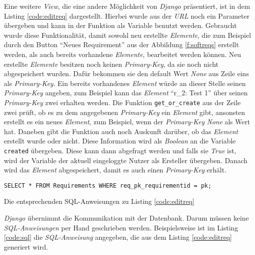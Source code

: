 \documentclass[11pt,a4paper]{report}
\begin{document}
Eine weitere \textit{View}, die eine andere Möglichkeit von \textit{Django} präsentiert, ist in dem Listing \ref{code:editreq} dargestellt. Hierbei wurde aus der \textit{URL} noch ein Parameter übergeben und kann in der Funktion als Variable benutzt werden. Gebraucht wurde diese Funktionalität, damit sowohl neu erstellte \textit{Elemente}, die zum Beispiel durch den Button "`Neues Requirement"' aus der Abbildung \ref{f:softreqs} erstellt werden, als auch bereits vorhandene \textit{Elemente}, bearbeitet werden können. Neu erstellte \textit{Elemente} besitzen noch keinen \textit{Primary-Key}, da sie noch nicht abgespeichert wurden. Dafür bekommen sie den default Wert \textit{None} aus Zeile eins als \textit{Primary-Key}. Ein bereits vorhandenes \textit{Element} würde an dieser Stelle seinen \textit{Primary-Key} angeben, zum Beispiel kann das \textit{Element} "`r\_2: Test 1"' über seinen \textit{Primary-Key} zwei erhalten werden. Die Funktion \verb|get_or_create| aus der Zeile zwei prüft, ob es zu dem angegebenen \textit{Primary-Key} ein \textit{Element} gibt, ansonsten erstellt es ein neues \textit{Element}, zum Beispiel, wenn der \textit{Primary-Key} \textit{None} als Wert hat. Daneben gibt die Funktion auch noch Auskunft darüber, ob das \textit{Element} erstellt wurde oder nicht. Diese Information wird als \textit{Boolean} an die Variable \verb|created| übergeben. Diese kann dann abgefragt werden und falls sie \textit{True} ist, wird der Variable der aktuell eingeloggte Nutzer als Ersteller übergeben. Danach wird das \textit{Element} abgespeichert, damit es auch einen \textit{Primary-Key} erhält.



\begin{listing}[htbp]
\begin{lstlisting}
SELECT * FROM Requirements WHERE req_pk_requirementid = pk;
\end{lstlisting}
\caption{Die entsprechenden SQL-Anweisungen zu Listing \ref{code:editreq}}
\label{code:sql}
\end{listing}

\textit{Django} übernimmt die Kommunikation mit der Datenbank. Darum müssen keine \textit{SQL-Anweisungen} per Hand geschrieben werden. Beispielsweise ist im Listing \ref{code:sql} die \textit{SQL-Anweisung} angegeben, die aus dem Listing \ref{code:editreq} generiert wird.
\end{document}
